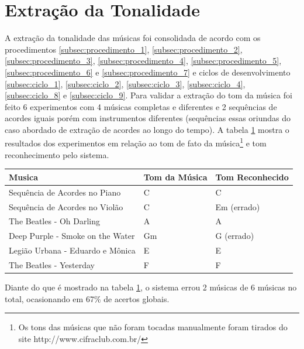 \section{Extração da Tonalidade}

A extração da tonalidade das músicas foi consolidada de acordo com os procedimentos \ref{subsec:procedimento_1}, \ref{subsec:procedimento_2}, \ref{subsec:procedimento_3}, \ref{subsec:procedimento_4}, \ref{subsec:procedimento_5}, \ref{subsec:procedimento_6} e \ref{subsec:procedimento_7} e ciclos de desenvolvimento \ref{subsec:ciclo_1}, \ref{subsec:ciclo_2}, \ref{subsec:ciclo_3}, \ref{subsec:ciclo_4}, \ref{subsec:ciclo_8} e \ref{subsec:ciclo_9}. Para validar a extração do tom da música foi feito 6 experimentos com 4 músicas completas e diferentes e 2 sequências de acordes iguais porém com instrumentos diferentes (sequências essas oriundas do caso abordado de extração de acordes ao longo do tempo). A tabela \ref{tab:tons} mostra o resultados dos experimentos em relação ao tom de fato da música\footnote{Os tons das músicas que não foram tocadas manualmente foram tirados do site http://www.cifraclub.com.br/} e tom reconhecimento pelo sistema.

\begin{table}[h]
\centering
\begin{tabular}{|l|l|l|}
\hline
Musica                           & Tom da Música & Tom Reconhecido \\ \hline
Sequência de Acordes no Piano    & C             & C               \\ \hline
Sequência de Acordes no Violão   & C             & Em (errado)     \\ \hline
The Beatles - Oh Darling         & A             & A               \\ \hline
Deep Purple - Smoke on the Water & Gm            & G (errado)      \\ \hline
Legião Urbana - Eduardo e Mônica & E             & E               \\ \hline
The Beatles - Yesterday          & F             & F               \\ \hline
\end{tabular}
\label{tab:tons}
\end{table}

Diante do que é mostrado na tabela \ref{tab:tons}, o sistema errou 2 músicas de 6 músicas no total, ocasionando em 67\% de acertos globais.

